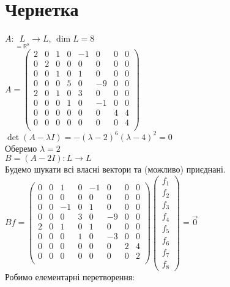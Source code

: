 \documentclass[a4paper, 10pt]{article}
\theoremstyle{theoremdd}
\theoremstyle{theoremdd}
\theoremstyle{theoremdd}
\theoremstyle{theoremdd}
\theoremstyle{theoremdd}
\theoremstyle{theoremdd}
\theoremstyle{theoremdd}
\theoremstyle{theoremdd}
\begin{document}
\section*{Чернетка}
$A: \underset{= \mathbb{R}^8}{L} \to L$, $\dim L = 8$\\
$A = \begin{pmatrix}
2 & 0 & 1 & 0 & -1 & 0 & 0 & 0 \\
0 & 2 & 0 & 0 & 0 & 0 & 0 & 0 \\
0 & 0 & 1 & 0 & 1 & 0 & 0 & 0 \\
0 & 0 & 0 & 5 & 0 & -9 & 0 & 0 \\
2 & 0 & 1 & 0 & 3 & 0 & 0 & 0 \\
0 & 0 & 0 & 1 & 0 & -1 & 0 & 0 \\
0 & 0 & 0 & 0 & 0 & 0 & 4 & 4 \\
0 & 0 & 0 & 0 & 0 & 0 & 0 & 4 \\
\end{pmatrix}$\\
$\det (A - \lambda I) = -(\lambda - 2)^6 (\lambda - 4)^2 = 0$\\
Оберемо $\lambda = 2$\\
$B = (A - 2I): L \to L$\\
Будемо шукати всі власні вектори та (можливо) приєднані.\\
$Bf = \begin{pmatrix}
0 & 0 & 1 & 0 & -1 & 0 & 0 & 0 \\
0 & 0 & 0 & 0 & 0 & 0 & 0 & 0 \\
0 & 0 & -1 & 0 & 1 & 0 & 0 & 0 \\
0 & 0 & 0 & 3 & 0 & -9 & 0 & 0 \\
2 & 0 & 1 & 0 & 1 & 0 & 0 & 0 \\
0 & 0 & 0 & 1 & 0 & -3 & 0 & 0 \\
0 & 0 & 0 & 0 & 0 & 0 & 2 & 4 \\
0 & 0 & 0 & 0 & 0 & 0 & 0 & 2 \\
\end{pmatrix} \begin{pmatrix}
f_1 \\ f_2 \\ f_3 \\ f_4 \\ f_5 \\ f_6 \\ f_7 \\ f_8
\end{pmatrix} = \vec{0}$\\
Робимо елементарні перетворення:\\
\end{document}
